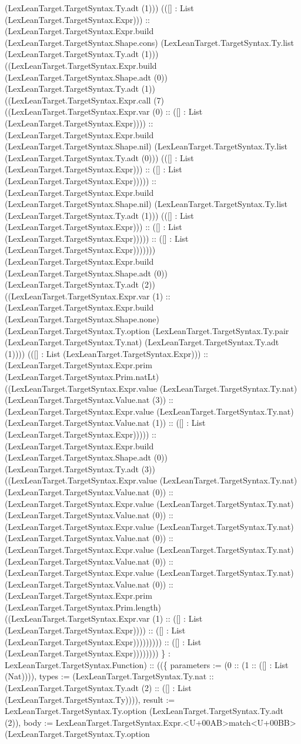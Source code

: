 \documentclass[11pt]{article}
\begin{document}
(LexLeanTarget.TargetSyntax.Ty.adt (1))) (([] : List (LexLeanTarget.TargetSyntax.Expr))) :: (LexLeanTarget.TargetSyntax.Expr.build (LexLeanTarget.TargetSyntax.Shape.cons) (LexLeanTarget.TargetSyntax.Ty.list (LexLeanTarget.TargetSyntax.Ty.adt (1))) ((LexLeanTarget.TargetSyntax.Expr.build (LexLeanTarget.TargetSyntax.Shape.adt (0)) (LexLeanTarget.TargetSyntax.Ty.adt (1)) ((LexLeanTarget.TargetSyntax.Expr.call (7) ((LexLeanTarget.TargetSyntax.Expr.var (0) :: ([] : List (LexLeanTarget.TargetSyntax.Expr)))) :: (LexLeanTarget.TargetSyntax.Expr.build (LexLeanTarget.TargetSyntax.Shape.nil) (LexLeanTarget.TargetSyntax.Ty.list (LexLeanTarget.TargetSyntax.Ty.adt (0))) (([] : List (LexLeanTarget.TargetSyntax.Expr))) :: ([] : List (LexLeanTarget.TargetSyntax.Expr))))) :: (LexLeanTarget.TargetSyntax.Expr.build (LexLeanTarget.TargetSyntax.Shape.nil) (LexLeanTarget.TargetSyntax.Ty.list (LexLeanTarget.TargetSyntax.Ty.adt (1))) (([] : List (LexLeanTarget.TargetSyntax.Expr))) :: ([] : List (LexLeanTarget.TargetSyntax.Expr))))) :: ([] : List (LexLeanTarget.TargetSyntax.Expr))))))) (LexLeanTarget.TargetSyntax.Expr.build (LexLeanTarget.TargetSyntax.Shape.adt (0)) (LexLeanTarget.TargetSyntax.Ty.adt (2)) ((LexLeanTarget.TargetSyntax.Expr.var (1) :: (LexLeanTarget.TargetSyntax.Expr.build (LexLeanTarget.TargetSyntax.Shape.none) (LexLeanTarget.TargetSyntax.Ty.option (LexLeanTarget.TargetSyntax.Ty.pair (LexLeanTarget.TargetSyntax.Ty.nat) (LexLeanTarget.TargetSyntax.Ty.adt (1)))) (([] : List (LexLeanTarget.TargetSyntax.Expr))) :: (LexLeanTarget.TargetSyntax.Expr.prim (LexLeanTarget.TargetSyntax.Prim.natLt) ((LexLeanTarget.TargetSyntax.Expr.value (LexLeanTarget.TargetSyntax.Ty.nat) (LexLeanTarget.TargetSyntax.Value.nat (3)) :: (LexLeanTarget.TargetSyntax.Expr.value (LexLeanTarget.TargetSyntax.Ty.nat) (LexLeanTarget.TargetSyntax.Value.nat (1)) :: ([] : List (LexLeanTarget.TargetSyntax.Expr))))) :: (LexLeanTarget.TargetSyntax.Expr.build (LexLeanTarget.TargetSyntax.Shape.adt (0)) (LexLeanTarget.TargetSyntax.Ty.adt (3)) ((LexLeanTarget.TargetSyntax.Expr.value (LexLeanTarget.TargetSyntax.Ty.nat) (LexLeanTarget.TargetSyntax.Value.nat (0)) :: (LexLeanTarget.TargetSyntax.Expr.value (LexLeanTarget.TargetSyntax.Ty.nat) (LexLeanTarget.TargetSyntax.Value.nat (0)) :: (LexLeanTarget.TargetSyntax.Expr.value (LexLeanTarget.TargetSyntax.Ty.nat) (LexLeanTarget.TargetSyntax.Value.nat (0)) :: (LexLeanTarget.TargetSyntax.Expr.value (LexLeanTarget.TargetSyntax.Ty.nat) (LexLeanTarget.TargetSyntax.Value.nat (0)) :: (LexLeanTarget.TargetSyntax.Expr.value (LexLeanTarget.TargetSyntax.Ty.nat) (LexLeanTarget.TargetSyntax.Value.nat (0)) :: (LexLeanTarget.TargetSyntax.Expr.prim (LexLeanTarget.TargetSyntax.Prim.length) ((LexLeanTarget.TargetSyntax.Expr.var (1) :: ([] : List (LexLeanTarget.TargetSyntax.Expr)))) :: ([] : List (LexLeanTarget.TargetSyntax.Expr))))))))) :: ([] : List (LexLeanTarget.TargetSyntax.Expr)))))))) \} : LexLeanTarget.TargetSyntax.Function) :: ((\{ parameters := (0 :: (1 :: ([] : List (Nat)))), types := (LexLeanTarget.TargetSyntax.Ty.nat :: (LexLeanTarget.TargetSyntax.Ty.adt (2) :: ([] : List (LexLeanTarget.TargetSyntax.Ty)))), result := LexLeanTarget.TargetSyntax.Ty.option (LexLeanTarget.TargetSyntax.Ty.adt (2)), body := LexLeanTarget.TargetSyntax.Expr.<U+00AB>match<U+00BB> (LexLeanTarget.TargetSyntax.Ty.option 
\end{document}
